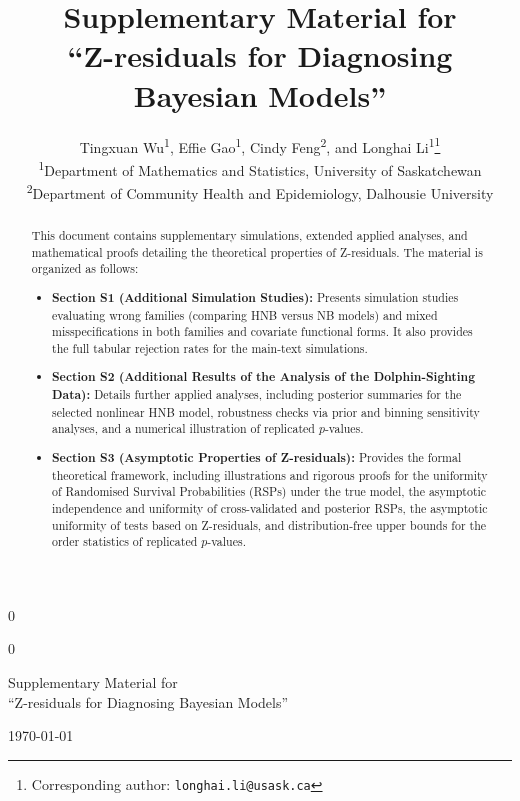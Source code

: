 \documentclass[
  12pt]{article}
\providecommand{\anon}{0} %
\let\OLDmaketitle\maketitle
\renewcommand{\maketitle}{\begingroup\setstretch{1}\OLDmaketitle\endgroup}
\theoremstyle{plain}
\theoremstyle{definition}
\theoremstyle{remark}
\begin{document}
\def\spacingset#1{\renewcommand{\baselinestretch}%
{#1}\small\normalsize} \spacingset{1}


\anon
{
  \title{\bf 
  Supplementary Material for \\ ``Z-residuals for Diagnosing Bayesian Models''
  }
  
\author{%
  Tingxuan Wu\textsuperscript{1},
  Effie Gao\textsuperscript{1},
  Cindy Feng\textsuperscript{2},
  and Longhai Li\textsuperscript{1}\thanks{Corresponding author: \texttt{longhai.li@usask.ca}}\\[1em]
  \textsuperscript{1}Department of Mathematics and Statistics, University of Saskatchewan\\
  \textsuperscript{2}Department of Community Health and Epidemiology, Dalhousie University
}
  \maketitle
} \fi

\anon
{
  \bigskip
  \bigskip
  \bigskip
  \begin{center}
    {\LARGE\bf 

      Supplementary Material for \\ ``Z-residuals for Diagnosing Bayesian Models''

    }
    \today
\end{center}
  \medskip
} \fi

\bigskip

\begin{abstract}
This document contains supplementary simulations, extended applied analyses, and mathematical proofs detailing the theoretical properties of Z-residuals. The material is organized as follows:

\begin{itemize}
    \item \textbf{Section S1 (Additional Simulation Studies):} Presents simulation studies evaluating wrong families (comparing HNB versus NB models) and mixed misspecifications in both families and covariate functional forms. It also provides the full tabular rejection rates for the main-text simulations.
    
    \item \textbf{Section S2 (Additional Results of the Analysis of the Dolphin-Sighting Data):} Details further applied analyses, including posterior summaries for the selected nonlinear HNB model, robustness checks via prior and binning sensitivity analyses, and a numerical illustration of replicated $p$-values.
    
    \item \textbf{Section S3 (Asymptotic Properties of Z-residuals):} Provides the formal theoretical framework, including illustrations and rigorous proofs for the uniformity of Randomised Survival Probabilities (RSPs) under the true model, the asymptotic independence and uniformity of cross-validated and posterior RSPs, the asymptotic uniformity of tests based on Z-residuals, and distribution-free upper bounds for the order statistics of replicated $p$-values.
\end{itemize}
\end{abstract}
\end{document}
